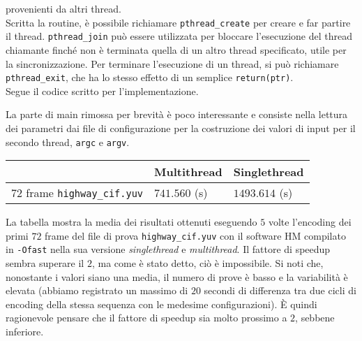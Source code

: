 provenienti da altri thread. \\
Scritta la routine, è possibile richiamare \verb|pthread_create| per creare e 
far partire il thread. \verb|pthread_join| può essere utilizzata per bloccare 
l'esecuzione del thread chiamante finché non è terminata quella di un altro 
thread specificato, utile per la sincronizzazione. Per terminare l'esecuzione 
di un thread, si può richiamare \verb|pthread_exit|, che ha lo stesso effetto 
di un semplice \verb|return(ptr)|.\\
Segue il codice scritto per l'implementazione.\\[8pt]
\begin{center}

\end{center}
La parte di main rimossa per brevità è poco interessante e consiste nella 
lettura dei parametri dai file di configurazione per la costruzione dei valori 
di input per il secondo thread, \verb|argc| e \verb|argv|.
\begin{center}
	\begin{tabular}{l | l | l}
		& Multithread & Singlethread \\
		\hline
		$72$ frame \verb|highway_cif.yuv| & $741.560$ (s) & $1493.614$ (s)
	\end{tabular}
\end{center}
La tabella mostra la media dei risultati ottenuti eseguendo $5$ volte 
l'encoding dei primi $72$ frame del file di prova \verb|highway_cif.yuv| con il 
software HM compilato in \verb|-Ofast| nella sua versione \emph{singlethread} e 
\emph{multithread}. Il fattore di speedup sembra superare il $2$, ma come è 
stato detto, ciò è impossibile. Si noti che, nonostante i valori siano una 
media, il numero di prove è basso e la variabilità è elevata (abbiamo 
registrato un massimo di $20$ secondi di differenza tra due cicli di encoding 
della stessa sequenza con le medesime configurazioni). \`E quindi ragionevole 
pensare che il fattore di speedup sia molto prossimo a $2$, sebbene inferiore.
